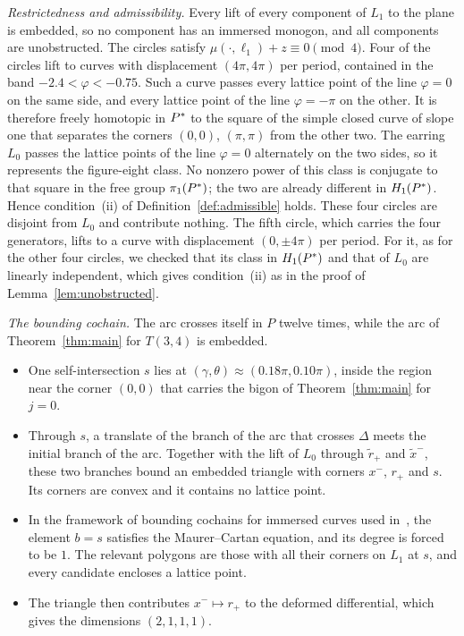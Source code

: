 \emph{Restrictedness and admissibility.} Every lift of every component of $L_1$ to the plane is embedded, so
no component has an immersed monogon, and all components are unobstructed. The circles satisfy
$\mu(\cdot,\ell_1)+z\equiv0\pmod4$. Four of the circles lift to curves with displacement $(4\pi,4\pi)$ per period,
contained in the band $-2.4<\varphi<-0.75$. Such a curve passes every lattice point of the line $\varphi=0$ on the
same side, and every lattice point of the line $\varphi=-\pi$ on the other. It is therefore freely homotopic in
$P^{*}$ to the square of the simple closed curve of slope one that separates the corners $(0,0)$, $(\pi,\pi)$ from
the other two. The earring $L_0$ passes the lattice points of the line $\varphi=0$ alternately on the two sides,
so it represents the figure-eight class. No nonzero power of this class is conjugate to that square in the
free group $\pi_1(P^{*})$; the two are already different in $H_1(P^{*})$. Hence condition~(ii) of
Definition~\ref{def:admissible} holds. These four circles are disjoint from $L_0$ and contribute nothing. The fifth
circle, which carries the four generators, lifts to a curve with displacement $(0,\pm4\pi)$ per period. For it, as for
the other four circles, we checked that its class in $H_1(P^{*})$ and that of $L_0$ are linearly independent, which gives
condition~(ii) as in the proof of Lemma~\ref{lem:unobstructed}.

\emph{The bounding cochain.} The arc crosses itself in $P$ twelve times, while the arc of Theorem~\ref{thm:main}
for $T(3,4)$ is embedded.
\begin{itemize}
\item One self-intersection $s$ lies at $(\gamma,\theta)\approx(0.18\pi,0.10\pi)$, inside the region near the corner $(0,0)$
that carries the bigon of Theorem~\ref{thm:main} for $j=0$.
\item Through $s$, a translate of the branch of the arc that crosses $\Delta$ meets the initial branch of the arc.
Together with the lift of $L_0$ through $\tilde r_+$ and $\tilde x^-$, these two branches bound an embedded triangle with
corners $x^-$, $r_+$ and $s$. Its corners are convex and it contains no lattice point.
\item In the framework of bounding cochains for immersed curves used in~\cite{CHKK}, the element $b=s$
satisfies the Maurer--Cartan equation, and its degree is forced to be $1$. The relevant polygons are those
with all their corners on $L_1$ at $s$, and every candidate encloses a lattice point.
\item The triangle then contributes $x^-\mapsto r_+$ to the deformed differential, which gives the dimensions
$(2,1,1,1)$.
\end{itemize}

